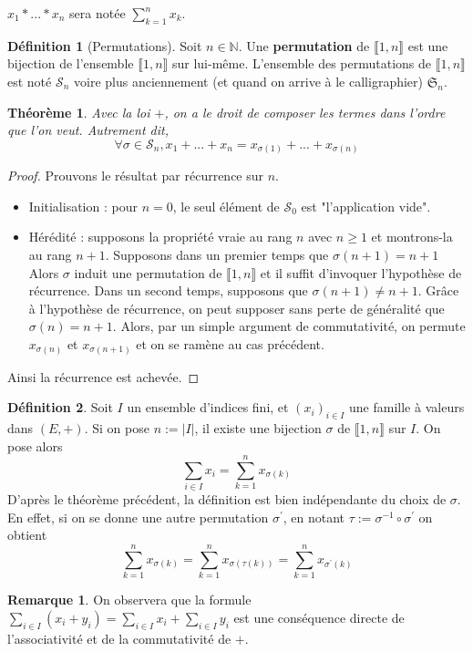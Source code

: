 \documentclass[french]{book}
\theoremstyle{plain}
\newtheorem{thm}{Théorème}[chapter]
\theoremstyle{definition}
\newtheorem{dfn}{Définition}[chapter]
\newtheorem{rmq}{Remarque}[chapter]
\theoremstyle{remark}
\begin{document}
$x_{1}*...*x_{n}$ sera notée $\displaystyle\sum_{k=1}^{n}x_{k}$.
\begin{dfn}[Permutations]
	Soit $n\in\mathbb{N}$. Une \textbf{permutation} de $\llbracket1,n\rrbracket$ est une bijection de l'ensemble $\llbracket1,n\rrbracket$ sur lui-même. L'ensemble des permutations de $\llbracket1,n\rrbracket$ est noté $\mathcal{S}_{n}$ voire plus anciennement (et quand on arrive à le calligraphier) $\mathfrak{S}_n$.
\end{dfn}
\begin{thm}
	Avec la loi $+$, on a le droit de composer les termes dans l'ordre que l'on veut.
Autrement dit, $$\forall\sigma\in\mathcal{S}_{n},x_{1}+...+x_{n}=x_{\sigma(1)}+...+x_{\sigma(n)}$$
\end{thm}
\begin{proof}
	Prouvons le résultat par récurrence sur $n$.
\begin{itemize}
	\item Initialisation : pour $n=0$, le seul élément de $\mathcal{S}_{0}$ est "l'application vide".
	\item Hérédité : supposons la propriété vraie au rang $n$ avec $n\geqslant1$ et montrons-la au rang $n+1$. Supposons dans un premier temps que $\sigma(n+1)=n+1$ Alors $\sigma$ induit une permutation de $\llbracket1,n\rrbracket$ et il suffit d'invoquer l'hypothèse de récurrence. Dans un second temps, supposons que $\sigma(n+1)\ne n+1$. Grâce à l'hypothèse de récurrence, on peut supposer sans perte de généralité que $\sigma(n)=n+1$. Alors, par un simple argument de commutativité, on permute $x_{\sigma(n)}$ et $x_{\sigma(n+1)}$ et on se ramène au cas précédent.
\end{itemize}
Ainsi la récurrence est achevée.
\end{proof}
\begin{dfn}
	Soit $I$ un ensemble d'indices fini, et $(x_{i})_{i\in I}$ une famille à valeurs dans $(E,+)$. Si on pose $n:=|I|$, il existe une bijection $\sigma$ de $\llbracket1,n\rrbracket$ sur $I$. On pose alors $$\sum_{i\in I}x_{i}=\sum_{k=1}^{n}x_{\sigma(k)}$$
	D'après le théorème précédent, la définition est bien indépendante du choix de $\sigma$. En effet, si on se donne une autre permutation $\sigma^{\prime}$, en notant $\tau:=\sigma^{-1}\circ\sigma^{\prime}$ on obtient $$\sum_{k=1}^{n}x_{\sigma(k)}=\sum_{k=1}^{n}x_{\sigma(\tau(k))}=\sum_{k=1}^{n}x_{\sigma^{\prime}(k)}$$
\end{dfn}
\begin{rmq}
	On observera que la formule $\displaystyle\sum_{i\in I}(x_{i}+y_{i})=\sum_{i\in I}x_{i}+\sum_{i\in I}y_{i}$ est une conséquence directe de l'associativité et de la commutativité de $+$.
\end{rmq}
\end{document}
